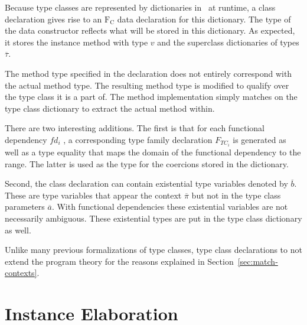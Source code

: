 Because type classes are represented by dictionaries in \systemfc ~at runtime, a
class declaration gives rise to an $\text{F}_\text{C}$ data declaration for
this dictionary. The type of the data constructor reflects what will be stored
in this dictionary. As expected, it stores the instance method with type $v$ and
the superclass dictionaries of types $\overline{\tau}$.

The method type specified in the declaration does not entirely correspond with
the actual method type. The resulting method type is modified to qualify over
the type class it is a part of. The method implementation simply matches on the
type class dictionary to extract the actual method within.

There are two interesting additions. The first is that for each functional
dependency $fd_i$ , a corresponding type family declaration $F_{TC_i}$ is
generated as well as a type equality that maps the domain of the functional
dependency to the range. The latter is used as the type for the coercions stored
in the dictionary.

Second, the class declaration can contain existential type variables denoted by
$\overline{b}$. These are type variables that appear the context
$\overline{\pi}$ but not in the type class parameters $\overline{a}$. With
functional dependencies these existential variables are not necessarily
ambiguous. These existential types are put in the type class dictionary as well.

Unlike many previous formalizations of type classes, type class
declarations to not extend the program theory for the reasons explained in
Section~\ref{sec:match-contexts}.

\section{Instance Elaboration}
\label{sec:instance-elaboration}

